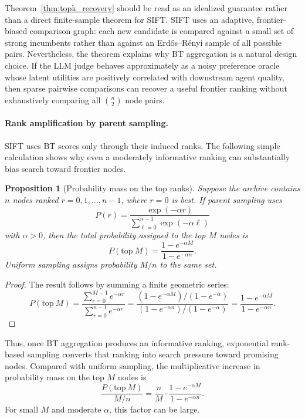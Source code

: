 \documentclass{article}
\newtheorem{proposition}{Proposition}
\begin{document}
Theorem~\ref{thm:topk_recovery} should be read as an idealized guarantee rather
than a direct finite-sample theorem for SIFT. SIFT uses an adaptive,
frontier-biased comparison graph: each new candidate is compared against a small
set of strong incumbents rather than against an Erd\H{o}s--R\'enyi sample of all
possible pairs. Nevertheless, the theorem explains why BT aggregation is a
natural design choice. If the LLM judge behaves approximately as a noisy
preference oracle whose latent utilities are positively correlated with
downstream agent quality, then sparse pairwise comparisons can recover a useful
frontier ranking without exhaustively comparing all $\binom{n}{2}$ node pairs.

\paragraph{Rank amplification by parent sampling.}
SIFT uses BT scores only through their induced ranks. The following simple
calculation shows why even a moderately informative ranking can substantially
bias search toward frontier nodes.

\begin{proposition}[Probability mass on the top ranks]
\label{prop:rank_amplification}
Suppose the archive contains $n$ nodes ranked $r=0,1,\ldots,n-1$, where
$r=0$ is best. If parent sampling uses
\[
    P(r)
    =
    \frac{\exp(-\alpha r)}
    {\sum_{\ell=0}^{n-1}\exp(-\alpha \ell)}
\]
with $\alpha>0$, then the total probability assigned to the top $M$ nodes is
\[
    P(\mathrm{top}\ M)
    =
    \frac{1-e^{-\alpha M}}{1-e^{-\alpha n}}.
\]
Uniform sampling assigns probability $M/n$ to the same set.
\end{proposition}

\begin{proof}
The result follows by summing a finite geometric series:
\[
    P(\mathrm{top}\ M)
    =
    \frac{\sum_{r=0}^{M-1} e^{-\alpha r}}
    {\sum_{r=0}^{n-1} e^{-\alpha r}}
    =
    \frac{(1-e^{-\alpha M})/(1-e^{-\alpha})}
    {(1-e^{-\alpha n})/(1-e^{-\alpha})}
    =
    \frac{1-e^{-\alpha M}}{1-e^{-\alpha n}}.
\]
\end{proof}

Thus, once BT aggregation produces an informative ranking, exponential
rank-based sampling converts that ranking into search pressure toward promising
nodes. Compared with uniform sampling, the multiplicative increase in probability
mass on the top $M$ nodes is
\[
    \frac{P(\mathrm{top}\ M)}{M/n}
    =
    \frac{n}{M}
    \cdot
    \frac{1-e^{-\alpha M}}{1-e^{-\alpha n}}.
\]
For small $M$ and moderate $\alpha$, this factor can be large.
\end{document}
